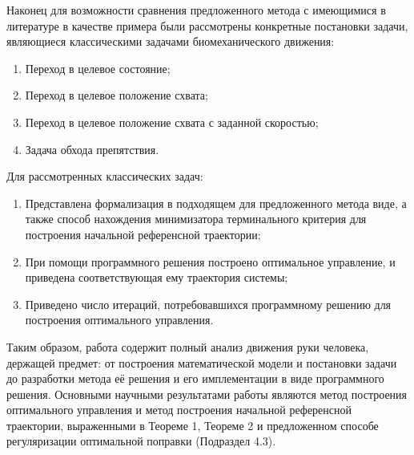 \documentclass[../doc.tex]{subfiles}
\begin{document}
    Наконец для возможности сравнения предложенного метода с имеющимися в литературе в качестве примера были
        рассмотрены конкретные постановки задачи, являющиеся классическими задачами биомеханического движения:
    \begin{enumerate}\itemsep0em
        \item Переход в целевое состояние;
        \item Переход в целевое положение схвата;
        \item Переход в целевое положение схвата с заданной скоростью;
        \item Задача обхода препятствия.
    \end{enumerate}
    Для рассмотренных классических задач:
    \begin{enumerate}\itemsep0em
        \item Представлена формализация в подходящем для предложенного метода виде,
            а также способ нахождения минимизатора терминального критерия для построения начальной референсной траектории;
        \item При помощи программного решения построено оптимальное управление, и приведена соответствующая ему траектория системы;
        \item Приведено число итераций, потребовавшихся программному решению для построения оптимального управления.
    \end{enumerate}

    Таким образом, работа содержит полный анализ движения руки человека, держащей предмет: от построения
        математической модели и постановки задачи до разработки метода её решения и его имплементации в виде
        программного решения.
    Основными научными результатами работы являются метод построения оптимального управления и метод построения 
        начальной референсной траектории, выраженными в Теореме 1, Теореме 2 и предложенном способе
        регуляризации оптимальной поправки (Подраздел 4.3).

    \ifSubfilesClassLoaded{
        \nocite{*}
        \clearpage
        
        
    }{}
\end{document}
